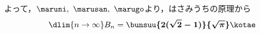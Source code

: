 \documentclass[../../../doc/main]{subfiles}
\begin{document}
\begin{enumerate}
            よって，$\maruni,~\marusan,~\marugo$より，はさみうちの原理から
            \begin{align*}
                \dlim{n\to\infty}B_n=\boldsymbol{\bunsuu{2(\sqrt{2}-1)}{\sqrt{\pi}}}\kotae
            \end{align*}
        \end{enumerate}
\end{document}
